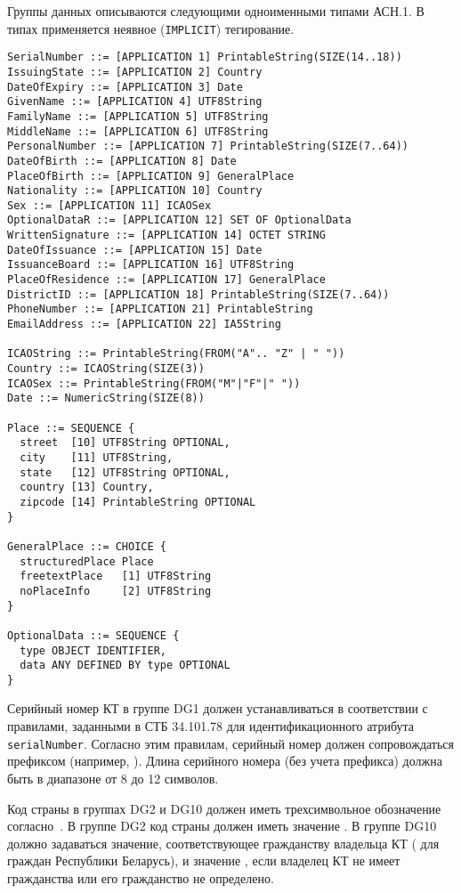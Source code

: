 Группы данных описываются следующими одноименными типами АСН.1.
В типах применяется неявное (\texttt{IMPLICIT}) тегирование.
\begin{verbatim}
SerialNumber ::= [APPLICATION 1] PrintableString(SIZE(14..18))
IssuingState ::= [APPLICATION 2] Country
DateOfExpiry ::= [APPLICATION 3] Date
GivenName ::= [APPLICATION 4] UTF8String
FamilyName ::= [APPLICATION 5] UTF8String
MiddleName ::= [APPLICATION 6] UTF8String
PersonalNumber ::= [APPLICATION 7] PrintableString(SIZE(7..64))
DateOfBirth ::= [APPLICATION 8] Date
PlaceOfBirth ::= [APPLICATION 9] GeneralPlace
Nationality ::= [APPLICATION 10] Country
Sex ::= [APPLICATION 11] ICAOSex
OptionalDataR ::= [APPLICATION 12] SET OF OptionalData
WrittenSignature ::= [APPLICATION 14] OCTET STRING
DateOfIssuance ::= [APPLICATION 15] Date
IssuanceBoard ::= [APPLICATION 16] UTF8String
PlaceOfResidence ::= [APPLICATION 17] GeneralPlace
DistrictID ::= [APPLICATION 18] PrintableString(SIZE(7..64))
PhoneNumber ::= [APPLICATION 21] PrintableString
EmailAddress ::= [APPLICATION 22] IA5String

ICAOString ::= PrintableString(FROM("A".. "Z" | " "))
Country ::= ICAOString(SIZE(3))
ICAOSex ::= PrintableString(FROM("M"|"F"|" "))
Date ::= NumericString(SIZE(8))

Place ::= SEQUENCE {
  street  [10] UTF8String OPTIONAL,
  city    [11] UTF8String,
  state   [12] UTF8String OPTIONAL,
  country [13] Country,
  zipcode [14] PrintableString OPTIONAL
}

GeneralPlace ::= CHOICE {
  structuredPlace Place
  freetextPlace   [1] UTF8String
  noPlaceInfo     [2] UTF8String
}

OptionalData ::= SEQUENCE {
  type OBJECT IDENTIFIER,
  data ANY DEFINED BY type OPTIONAL
}
\end{verbatim}

Серийный номер КТ в группе DG1 должен устанавливаться в соответствии с правилами,
заданными в СТБ 34.101.78 для идентификационного атрибута \verb|serialNumber|. 
Согласно этим правилам, серийный номер должен сопровождаться префиксом 
 (например, ).
%
Длина серийного номера (без учета префикса) должна быть в 
диапазоне от 8 до 12 символов. 

Код страны в группах DG2 и DG10 должен иметь трехсимвольное обозначение 
согласно~\cite{CountryCodes}. 
%
В группе DG2 код страны должен иметь значение .
%
В группе DG10 должно задаваться значение, соответствующее
гражданству владельца КТ ( для граждан Республики Беларусь), 
и значение , если владелец КТ не имеет гражданства 
или его гражданство не определено.

